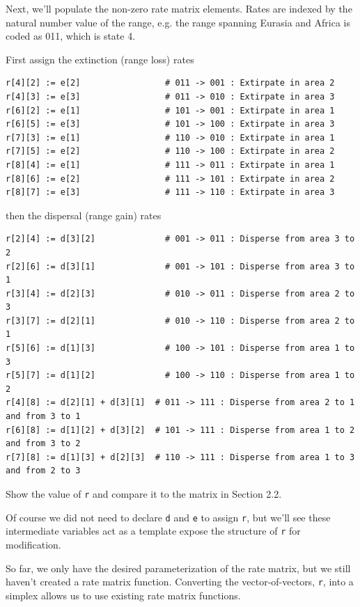 Next, we'll populate the non-zero rate matrix elements.
Rates are indexed by the natural number value of the range, e.g. the range spanning Eurasia and Africa is coded as 011, which is state 4.

First assign the extinction (range loss) rates

\begin{snugshade}
\begin{lstlisting}
r[4][2] := e[2]                 # 011 -> 001 : Extirpate in area 2
r[4][3] := e[3]                 # 011 -> 010 : Extirpate in area 3
r[6][2] := e[1]                 # 101 -> 001 : Extirpate in area 1
r[6][5] := e[3]                 # 101 -> 100 : Extirpate in area 3
r[7][3] := e[1]                 # 110 -> 010 : Extirpate in area 1
r[7][5] := e[2]                 # 110 -> 100 : Extirpate in area 2
r[8][4] := e[1]                 # 111 -> 011 : Extirpate in area 1
r[8][6] := e[2]                 # 111 -> 101 : Extirpate in area 2
r[8][7] := e[3]                 # 111 -> 110 : Extirpate in area 3
\end{lstlisting}
\end{snugshade}

then the dispersal (range gain) rates

\begin{snugshade}
\begin{lstlisting}
r[2][4] := d[3][2]              # 001 -> 011 : Disperse from area 3 to 2
r[2][6] := d[3][1]              # 001 -> 101 : Disperse from area 3 to 1
r[3][4] := d[2][3]              # 010 -> 011 : Disperse from area 2 to 3
r[3][7] := d[2][1]              # 010 -> 110 : Disperse from area 2 to 1
r[5][6] := d[1][3]              # 100 -> 101 : Disperse from area 1 to 3
r[5][7] := d[1][2]              # 100 -> 110 : Disperse from area 1 to 2
r[4][8] := d[2][1] + d[3][1]  # 011 -> 111 : Disperse from area 2 to 1 and from 3 to 1
r[6][8] := d[1][2] + d[3][2]  # 101 -> 111 : Disperse from area 1 to 2 and from 3 to 2
r[7][8] := d[1][3] + d[2][3]  # 110 -> 111 : Disperse from area 1 to 3 and from 2 to 3
\end{lstlisting}
\end{snugshade}

Show the value of {\tt r} and compare it to the matrix in Section 2.2.

Of course we did not need to declare {\tt d} and {\tt e} to assign {\tt r}, but we'll see these intermediate variables act as a template expose the structure of {\tt r} for modification.

So far, we only have the desired parameterization of the rate matrix, but we still haven't created a rate matrix function. Converting the vector-of-vectors, {\tt r}, into a simplex allows us to use existing rate matrix functions. 

